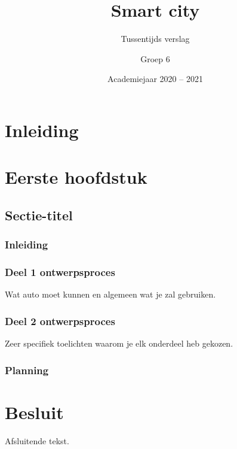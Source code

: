 \documentclass[a4paper,twoside,kulak]{kulakreport} %
\title{Smart city}
\subtitle{Tussentijds verslag}
\author{Groep 6}
\institute{KU Leuven Kulak, Wetenschap \& Technologie}
\date{Academiejaar 2020 -- 2021}
\begin{document}

\titlepage

\tableofcontents

\chapter*{Inleiding}

\chapter{Eerste hoofdstuk}
\section{Sectie-titel}
\subsection*{Inleiding}

\subsection{Deel 1 ontwerpsproces}
Wat auto moet kunnen en algemeen wat je zal gebruiken.

\subsection{Deel 2 ontwerpsproces}
Zeer specifiek toelichten waarom je elk onderdeel heb gekozen.

\subsection{Planning}

\chapter*{Besluit}
Afsluitende tekst.
\end{document}
